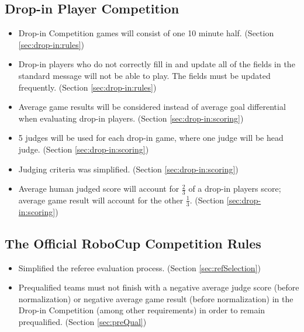 \documentclass[12pt]{article}
\begin{document}
\subsection*{Drop-in Player Competition}
\begin{itemize}	
	\item Drop-in Competition games will consist of one 10 minute half. (Section \ref{sec:drop-in:rules})
	\item Drop-in players who do not correctly fill in and update all of the fields in the standard message will not be able to play.  The fields must be updated frequently. (Section \ref{sec:drop-in:rules})
	\item Average game results will be considered instead of average goal differential when evaluating drop-in players. (Section \ref{sec:drop-in:scoring})
	\item 5 judges will be used for each drop-in game, where one judge will be head judge. (Section \ref{sec:drop-in:scoring})
	\item Judging criteria was simplified. (Section \ref{sec:drop-in:scoring})
	\item Average human judged score will account for $\frac{2}{3}$ of a drop-in players score; average game result will account for the other $\frac{1}{3}$. (Section \ref{sec:drop-in:scoring})
\end{itemize}

\subsection*{The Official RoboCup Competition Rules}
\begin{itemize}	
	\item Simplified the referee evaluation process. (Section \ref{sec:refSelection})
	\item Prequalified teams must not finish with a negative average judge score (before normalization) or negative average game result (before normalization) in the Drop-in Competition (among other requirements) in order to remain prequalified. (Section \ref{sec:preQual})
\end{itemize}
\end{document}
